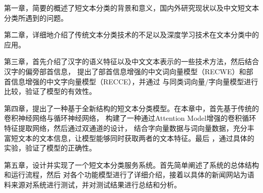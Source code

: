 \documentclass{standalone}
\begin{document}
第一章，简要的概述了短文本分类的背景和意义，国内外研究现状以及中文短文本分类所遇到的问题。

第二章，详细地介绍了传统文本分类技术的不足以及深度学习技术在文本分类中的应用。

第三章，首先介绍了汉字的语义特征以及中文文本表示的一些技术方法，然后结合汉字的偏旁部首信息，
提出了部首信息增强的中文词向量模型（RECWE）和部首信息增强的中文字向量模型（RECCE），并通过
与同类词向量/字向量模型进行比较，验证了模型的有效性。

第四章，提出了一种基于全新结构的短文本分类模型。在本章中，首先基于传统的卷积神经网络与循环神经网络，
构建了一种通过Attention Model增强的卷积循环特征提取网络，然后通过双通道的设计，
结合字向量数据与词向量数据，充分丰富短文本的文本信息，让模型能够同时获取两者的文本特征。最后
，通过具体的实验，验证了模型的正确性。

第五章，设计并实现了一个短文本分类服务系统。首先简单阐述了系统的总体结构和运行流程，然后
对各个功能模型进行了详细介绍，接着以具体的新闻网站为语料来源对系统进行测试，并对测试结果进行总结和分析。
\end{document}
